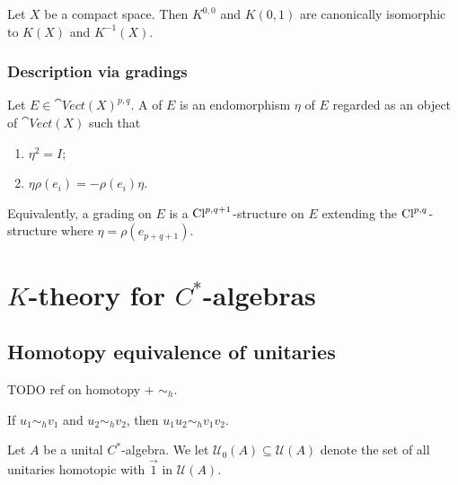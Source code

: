 \begin{theorem}
Let $X$ be a compact space. Then $K^{0,0}$ and $K(0,1)$ are canonically isomorphic to $K(X)$ and $K^{-1}(X)$.
\end{theorem}

\subsection{Description via gradings}
\begin{definition}
Let $E\in \cat{Vect}(X)^{p,q}$. A  of $E$ is an endomorphism $\eta$ of $E$ regarded as an object of $\cat{Vect}(X)$ such that
\begin{enumerate}
\item $\eta^2 = I$;
\item $\eta\rho(e_i) = -\rho(e_i)\eta$.
\end{enumerate}
Equivalently, a grading on $E$ is a $\operatorname{Cl}^{p,q+1}$-structure on $E$ extending the $\operatorname{Cl}^{p,q}$-structure where $\eta = \rho(e_{p+q+1})$.
\end{definition}

\chapter{$K$-theory for $C^*$-algebras}
\section{Homotopy equivalence of unitaries}
TODO ref on homotopy + $\sim_h$.

\begin{lemma} \label{productHomotopy}
If $u_1 \sim_h v_1$ and $u_2 \sim_h v_2$, then $ u_1u_2\sim_h v_1v_2$.
\end{lemma}

\begin{definition}
Let $A$ be a unital $C^*$-algebra. We let $\mathcal{U}_0(A)\subseteq \mathcal{U}(A)$ denote the set of all unitaries homotopic with $\vec{1}$ in $\mathcal{U}(A)$.
\end{definition}

